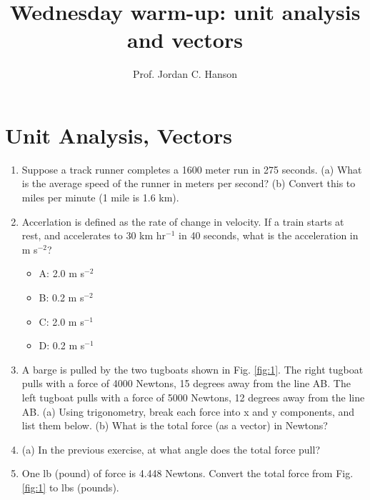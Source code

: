 \documentclass{article}
\begin{document}
\twocolumn

\title{Wednesday warm-up: unit analysis and vectors}
\author{Prof. Jordan C. Hanson}

\maketitle

\section{Unit Analysis, Vectors}

\begin{enumerate}
\item Suppose a track runner completes a 1600 meter run in 275 seconds.  (a) What is the average speed of the runner in meters per second? (b) Convert this to miles per minute (1 mile is 1.6 km). \\ \vspace{2cm}
\item Accerlation is defined as the rate of change in velocity.  If a train starts at rest, and accelerates to 30 km hr$^{-1}$ in 40 seconds,  what is the acceleration in m s$^{-2}$? 
\begin{itemize}
\item A: 2.0 m s$^{-2}$
\item B: 0.2 m s$^{-2}$
\item C: 2.0 m s$^{-1}$
\item D: 0.2 m s$^{-1}$
\end{itemize}
\item A barge is pulled by the two tugboats shown in Fig. \ref{fig:1}. The right tugboat pulls with a force of 4000 Newtons, 15 degrees away from the line AB.  The left tugboat pulls with a force of 5000 Newtons, 12 degrees away from the line AB.  (a) Using trigonometry, break each force into x and y components, and list them below.  (b) What is the total force (as a vector) in Newtons? \\ \vspace{3cm}
\item (a) In the previous exercise, at what angle does the total force pull? \\ \vspace{3cm}
\item One lb (pound) of force is 4.448 Newtons.  Convert the total force from Fig. \ref{fig:1} to lbs (pounds).
\end{enumerate}
\end{document}
